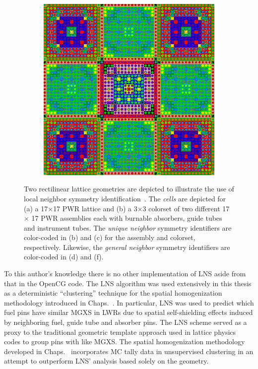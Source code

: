 \begin{figure}[h!]
\begin{subfigure}{.5\textwidth}
  \caption{}
  \label{fig:assm-neighbors}
\end{subfigure}
\begin{subfigure}{.5\textwidth}
  \centering
  \includegraphics[width=.7\linewidth]{figures/workflow/opencg/neighbor-cells-xy-colorset}
  \caption{}
  \label{fig:colorset-neighbors}
\end{subfigure}
\caption[Example OpenCG Local Neighbor Symmetry mappings]{Two rectilinear lattice geometries are depicted to illustrate the use of local neighbor symmetry identification~\cite{boyd2015opencg}. The \textit{cells} are depicted for (a) a 17$\times$17 PWR lattice and (b) a 3$\times$3 colorset of two different 17 $\times$ 17 PWR assemblies each with burnable absorbers, guide tubes and instrument tubes. The \textit{unique neighbor} symmetry identifiers are color-coded in (b) and (c) for the assembly and colorset, respectively. Likewise, the \textit{general neighbor} symmetry identifiers are color-coded in (d) and (f).}
\label{fig:neighbor-cells}
\end{figure}

To this author's knowledge there is no other implementation of \ac{LNS} aside from that in the OpenCG code. The \ac{LNS} algorithm was used extensively in this thesis as a deterministic ``clustering'' technique for the spatial homogenization methodology introduced in Chaps.~. In particular, \ac{LNS} was used to predict which fuel pins have similar \ac{MGXS} in \ac{LWR}s due to spatial self-shielding effects induced by neighboring fuel, guide tube and absorber pins. The \ac{LNS} scheme served as a proxy to the traditional geometric template approach used in lattice physics codes to group pins with like \ac{MGXS}. The spatial homogenization methodology developed in Chaps.~ incorporates \ac{MC} tally data in unsupervised clustering in an attempt to outperform \ac{LNS}' analysis based solely on the geometry.


